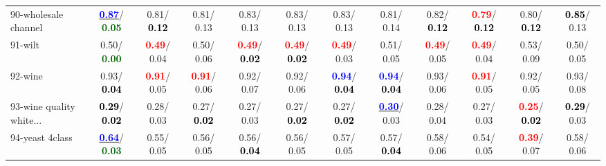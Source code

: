 \begin{table}[h]
\begin{center}
{\begin{tabular}{lc|c|c|c|c|c|c|c|c|c|c}
90-wholesale channel & \underline{\textcolor{blue}{\textbf{  0.87}}}/\textcolor{darkgreen}{\textbf{  0.05}} &   0.81/\textcolor{black}{\textbf{  0.12}} &   0.81/  0.13 &   0.83/  0.13 &   0.83/  0.13 &   0.83/  0.13 &   0.81/  0.14 &   0.82/\textcolor{black}{\textbf{  0.12}} & \textcolor{red}{\textbf{  0.79}}/\textcolor{black}{\textbf{  0.12}} &   0.80/\textcolor{black}{\textbf{  0.12}} & \textcolor{black}{\textbf{  0.85}}/  0.13 \\
91-wilt &   0.50/\textcolor{darkgreen}{\textbf{  0.00}} & \textcolor{red}{\textbf{  0.49}}/  0.04 &   0.50/  0.06 & \textcolor{red}{\textbf{  0.49}}/\textcolor{black}{\textbf{  0.02}} & \textcolor{red}{\textbf{  0.49}}/\textcolor{black}{\textbf{  0.02}} & \textcolor{red}{\textbf{  0.49}}/  0.03 &   0.51/  0.05 & \textcolor{red}{\textbf{  0.49}}/  0.05 & \textcolor{red}{\textbf{  0.49}}/  0.04 &   0.53/  0.09 &   0.50/  0.05 \\
92-wine &   0.93/\textcolor{black}{\textbf{  0.04}} & \textcolor{red}{\textbf{  0.91}}/  0.05 & \textcolor{red}{\textbf{  0.91}}/  0.06 &   0.92/  0.07 &   0.92/  0.06 & \textcolor{blue}{\textbf{  0.94}}/\textcolor{black}{\textbf{  0.04}} & \textcolor{blue}{\textbf{  0.94}}/\textcolor{black}{\textbf{  0.04}} &   0.93/  0.06 & \textcolor{red}{\textbf{  0.91}}/  0.05 &   0.92/  0.05 &   0.93/  0.08 \\ \hline
93-wine quality white... & \textcolor{black}{\textbf{  0.29}}/\textcolor{black}{\textbf{  0.02}} &   0.28/  0.03 &   0.27/\textcolor{black}{\textbf{  0.02}} &   0.27/  0.03 &   0.27/\textcolor{black}{\textbf{  0.02}} &   0.27/\textcolor{black}{\textbf{  0.02}} & \underline{\textcolor{blue}{\textbf{  0.30}}}/  0.03 &   0.28/  0.04 &   0.27/  0.03 & \textcolor{red}{\textbf{  0.25}}/\textcolor{black}{\textbf{  0.02}} & \textcolor{black}{\textbf{  0.29}}/  0.03 \\
94-yeast 4class & \underline{\textcolor{blue}{\textbf{  0.64}}}/\textcolor{darkgreen}{\textbf{  0.03}} &   0.55/  0.05 &   0.56/  0.05 &   0.56/\textcolor{black}{\textbf{  0.04}} &   0.56/  0.05 &   0.57/  0.05 &   0.57/\textcolor{black}{\textbf{  0.04}} &   0.58/  0.06 &   0.54/  0.05 & \textcolor{red}{\textbf{  0.39}}/  0.07 &   0.58/  0.06 \\\end{tabular}}\label{stratsBalAcc2aCIELM}
\end{center}
\end{table}
